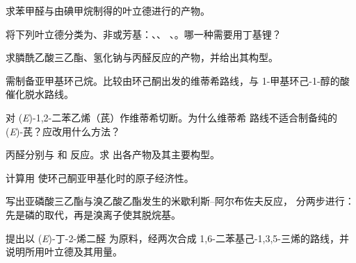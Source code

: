 \begin{exercise}[$\star$]\label{exo:b2:wittig:2}
求苯甲醛与由碘甲烷制得的叶立德进行的产物。
\end{exercise}

\begin{exercise}[$\star$]\label{exo:b2:wittig:3}
将下列叶立德分类为、非或芳基：、、
、。哪一种需要用丁基锂？
\end{exercise}

\begin{exercise}[$\star$]\label{exo:b2:wittig:4}
求膦酰乙酸三乙酯、氢化钠与丙醛反应的产物，并给出其构型。
\end{exercise}

\begin{exercise}[$\star\star$]\label{exo:b2:wittig:5}
需制备亚甲基环己烷。比较由环己酮出发的维蒂希路线，与
1-甲基环己-1-醇的酸催化脱水路线。
\end{exercise}

\begin{exercise}[$\star\star$]\label{exo:b2:wittig:6}
对 (\textit{E})-1,2-二苯乙烯（芪）作维蒂希切断。为什么维蒂希
路线不适合制备纯的 (\textit{E})-芪？应改用什么方法？
\end{exercise}

\begin{exercise}[$\star\star$]\label{exo:b2:wittig:7}
丙醛分别与  和  反应。求
出各产物及其主要构型。
\end{exercise}

\begin{exercise}[$\star\star$]\label{exo:b2:wittig:8}
计算用  使环己酮亚甲基化时的原子经济性。
\end{exercise}

\begin{exercise}[$\star\star$]\label{exo:b2:wittig:9}
写出亚磷酸三乙酯与溴乙酸乙酯发生的米歇利斯–阿尔布佐夫反应，
分两步进行：先是磷的取代，再是溴离子使其脱烷基。
\end{exercise}

\begin{exercise}[$\star\star\star$]\label{exo:b2:wittig:10}
提出以 (\textit{E})-丁-2-烯二醛
 为原料，经两次合成 1,6-二苯基己-1,3,5-三烯的路线，并说明所用叶立德及其用量。
\end{exercise}

